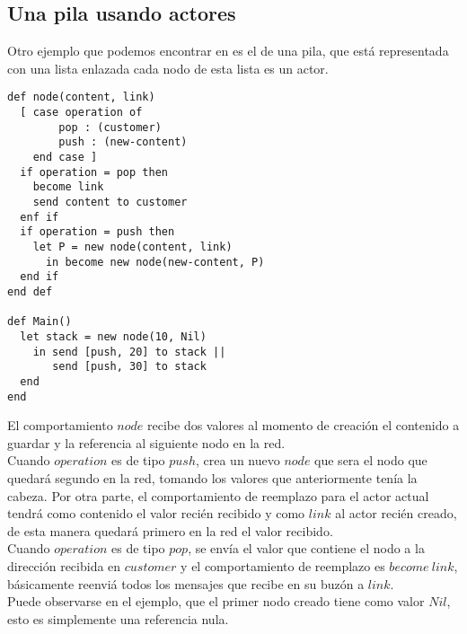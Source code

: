 \subsection{Una pila usando actores}

Otro ejemplo que podemos encontrar en \cite{Agha:1986:AMC:7929} es el de una pila,
que está representada con una lista enlazada cada nodo de esta lista es un actor. 

\begin{lstlisting}[language=sal, style=simple]
def node(content, link)
  [ case operation of
        pop : (customer)
        push : (new-content)
    end case ]
  if operation = pop then
    become link
    send content to customer
  enf if
  if operation = push then
    let P = new node(content, link)
      in become new node(new-content, P) 
  end if
end def

def Main() 
  let stack = new node(10, Nil)
    in send [push, 20] to stack ||
       send [push, 30] to stack
  end
end
\end{lstlisting}

El comportamiento $node$ recibe dos valores al momento de creación el contenido a guardar y la referencia al siguiente nodo en la red. \\
Cuando $operation$ es de tipo $push$, crea un nuevo $node$ que sera el nodo que quedará segundo en la red, 
tomando los valores que anteriormente tenía la cabeza. Por otra parte, el comportamiento de reemplazo para el actor actual tendrá 
como contenido el valor recién recibido y como $link$ al actor recién creado, de esta manera quedará primero en la red el valor recibido. \\
Cuando $operation$ es de tipo $pop$, se envía el valor que contiene el nodo a la dirección recibida en $customer$ y el comportamiento 
de reemplazo es $become\ link$, básicamente reenviá todos los mensajes que recibe en su buzón a $link$. \\
Puede observarse en el ejemplo, que el primer nodo creado tiene como valor $Nil$, esto es simplemente una referencia nula. 
